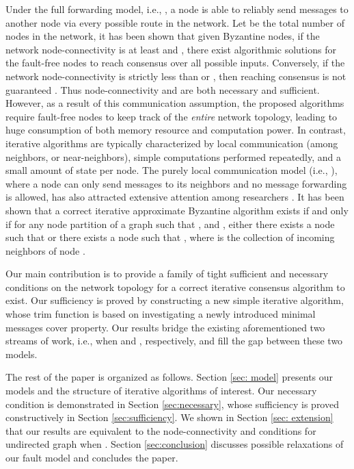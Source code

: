 \documentclass[letterpaper, 11pt]{article}
\begin{document}
Under the full forwarding model, i.e., , a node is able to reliably send messages to another node via every possible route in the network. Let  be the total number of nodes in the network, it has been shown that given  Byzantine nodes, if the network node-connectivity is at least  and , there exist algorithmic solutions for the fault-free nodes to reach consensus over all possible inputs. Conversely, if the network node-connectivity is strictly less than  or , then reaching consensus is not guaranteed \cite{impossible_proof_lynch}. Thus  node-connectivity and  are both necessary and sufficient.
However,  as a result of this communication assumption, the proposed algorithms require fault-free nodes to keep track of the \emph{entire} network topology, leading to huge consumption of both memory resource and computation power.
In contrast, iterative algorithms are typically characterized by local communication (among neighbors, or near-neighbors), simple computations performed repeatedly, and a small amount of state per node.
The purely local communication model (i.e., ), where a node can only send messages to its neighbors and no message forwarding is allowed, has also attracted extensive attention among researchers \cite{Benezit, leblanc_HiCoNs,jadbabaie_concensus,Vaidya2012IABC,Vaidyamatrix, vaidyaII}.
It has been shown that a correct iterative approximate Byzantine algorithm exists if and only if for any node partition  of a graph such that ,  and , either there exists a node  such that  or there exists a node  such that , where  is the collection of incoming neighbors of node .


 Our main contribution is to provide a family of tight sufficient and necessary conditions on the network topology for a correct iterative consensus algorithm to exist. Our sufficiency is proved by constructing a new simple iterative algorithm, whose trim function is based on investigating a newly introduced minimal messages cover property.
Our results bridge the existing aforementioned two streams of work, i.e., when  and , respectively, and fill the gap between these two models.






The rest of the paper is  organized as follows. Section \ref{sec: model} presents our models and the structure of iterative algorithms of interest. Our necessary condition is demonstrated in Section \ref{sec:necessary}, whose sufficiency is proved constructively in Section \ref{sec:sufficiency}. We shown in Section \ref{sec: extension} that our results are equivalent to the  node-connectivity and  conditions for undirected graph when . Section \ref{sec:conclusion} discusses possible relaxations of our fault model and concludes the paper.
\end{document}
